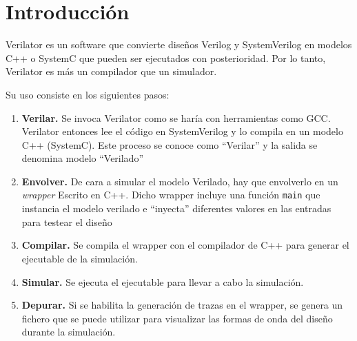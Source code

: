 \chapter{Introducción}\label{cap:introduccion}
Verilator es un software que convierte diseños Verilog y SystemVerilog en modelos C++ o SystemC que pueden ser ejecutados con posterioridad. Por lo tanto, Verilator es más un compilador que un simulador.

Su uso consiste en los siguientes pasos:
\begin{enumerate}
    \item \textbf{Verilar.} Se invoca Verilator como se haría con herramientas como GCC. Verilator entonces lee el código en SystemVerilog y lo compila en un modelo C++ (SystemC). Este proceso se conoce como ``Verilar'' y la salida se denomina modelo ``Verilado''
    \item \textbf{Envolver.} De cara a simular el modelo Verilado, hay que envolverlo en un \textit{wrapper} Escrito en C++. Dicho wrapper incluye una función \verb|main| que instancia el modelo verilado e ``inyecta'' diferentes valores en las entradas para testear el diseño
    \item \textbf{Compilar.} Se compila el wrapper con el compilador de C++ para generar el ejecutable de la simulación.
    \item \textbf{Simular.} Se ejecuta el ejecutable para llevar a cabo la simulación.
    \item \textbf{Depurar. } Si se habilita la generación de trazas en el wrapper, se genera un fichero que se puede utilizar para visualizar las formas de onda del diseño durante la simulación.
\end{enumerate}

